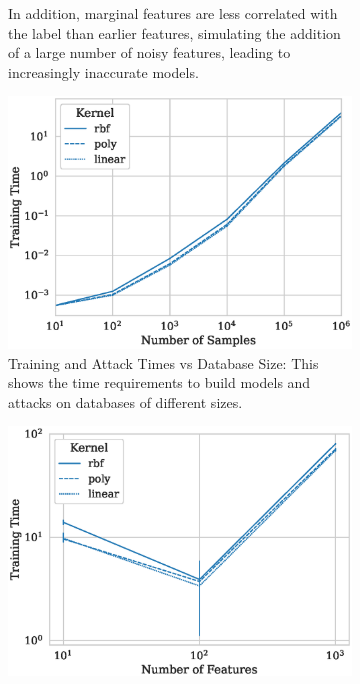 \documentclass[fonts]{icst}
\begin{document}
\begin{figure}
\begin{subfigure}{.45\textwidth}
{In addition, marginal features are less correlated with the label than earlier features, simulating the addition of a large number of noisy features, leading to increasingly inaccurate models.}
        \label{fig:features_acc}
    \end{subfigure}
    \hfill
    \begin{subfigure}{.45\textwidth}
        \centering
        \includegraphics[width=\textwidth]{./generated/train_time_vs_samples.eps}
        \caption{Training and Attack Times vs Database Size: This shows the time requirements to build models and attacks on databases of different sizes.
        }
        \label{fig:samples_time}
    \end{subfigure}
    \hfill
    \begin{subfigure}{.45\textwidth}
      \centering
        \includegraphics[width=\textwidth]{./generated/train_time_vs_features.eps}

\end{subfigure}
\end{figure}
\end{document}
